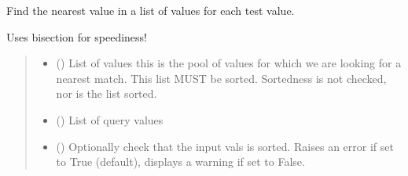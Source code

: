 \documentclass[letterpaper,10pt,english]{sphinxmanual}
\begin{document}
\begin{fulllineitems}
\label{\detokenize{users_guide:GeoSpatialTools.neighbours.find_nearest}}
\pysigstartsignatures
\pysiglinewithargsret
{}
{\sphinxparamcomma {}\sphinxparamcomma {}}
{}
\pysigstopsignatures
\sphinxAtStartPar
Find the nearest value in a list of values for each test value.

\sphinxAtStartPar
Uses bisection for speediness!
\begin{quote}\begin{description}
\begin{itemize}
\item {} 
\sphinxAtStartPar
{} (\sphinxstyleliteralemphasis{\sphinxupquote{{[}}}\sphinxstyleliteralemphasis{\sphinxupquote{{]}}}) \textendash{} List of values \sphinxhyphen{} this is the pool of values for which we are looking
for a nearest match. This list MUST be sorted. Sortedness is not
checked, nor is the list sorted.

\item {} 
\sphinxAtStartPar
{} (\sphinxstyleliteralemphasis{\sphinxupquote{{[}}}\sphinxstyleliteralemphasis{\sphinxupquote{{]} }}\sphinxstyleliteralemphasis{\sphinxupquote{| }}) \textendash{} List of query values

\item {} 
\sphinxAtStartPar
{} () \textendash{} Optionally check that the input vals is sorted. Raises an error if set
to True (default), displays a warning if set to False.

\end{itemize}

\sphinxAtStartPar
{}


\end{description}
\end{quote}
\end{fulllineitems}
\end{document}

